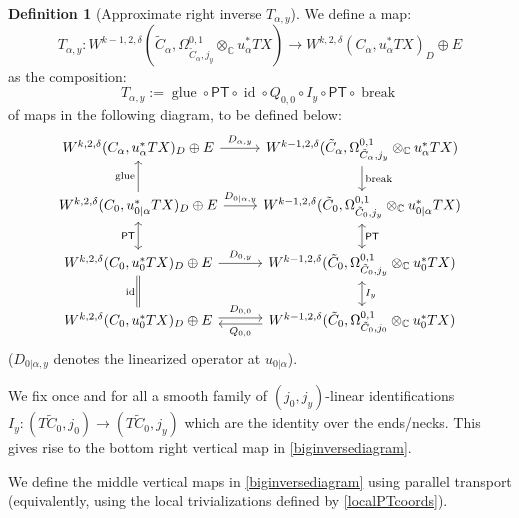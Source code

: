 \documentclass[12pt]{article}
\theoremstyle{definition}
\newtheorem{definition}[theorem]{Definition}
\theoremstyle{remark}
\numberwithin{equation}{subsection}
\newcommand{\CC}{\mathbb C}
\newcommand{\PT}{\mathsf{PT}}
\newcommand{\id}{\operatorname{id}}
\begin{document}
\begin{definition}[Approximate right inverse $T_{\alpha,y}$]
We define a map:
\begin{equation}
T_{\alpha,y}:W^{k-1,2,\delta}(\tilde C_\alpha,\Omega^{0,1}_{\tilde C_\alpha,j_y}\otimes_\CC u_\alpha^\ast TX)\to W^{k,2,\delta}(C_\alpha,u_\alpha^\ast TX)_D\oplus E
\end{equation}
as the composition:
\begin{equation}
T_{\alpha,y}:={\operatorname{glue}}\circ\PT\circ\id\circ Q_{0,0}\circ I_y\circ\PT\circ\operatorname{break}
\end{equation}
of maps in the following diagram, to be defined below:
\begin{equation}\label{biginversediagram}
\begin{tikzcd}
W^{k,2,\delta}(C_\alpha,u_\alpha^\ast TX)_D\oplus E\ar{r}{D_{\alpha,y}}&W^{k-1,2,\delta}(\tilde C_\alpha,\Omega^{0,1}_{\tilde C_\alpha,j_y}\otimes_\CC u_\alpha^\ast TX)\ar{d}{\mathrm{break}}\\
W^{k,2,\delta}(C_0,u_{0|\alpha}^\ast TX)_D\oplus E\ar{u}{\mathrm{glue}}\ar{r}{D_{0|\alpha,y}}&W^{k-1,2,\delta}(\tilde C_0,\Omega^{0,1}_{\tilde C_0,j_y}\otimes_\CC u_{0|\alpha}^\ast TX)\ar[leftrightarrow]{d}{\PT}\\
W^{k,2,\delta}(C_0,u_0^\ast TX)_D\oplus E\ar[leftrightarrow]{u}{\PT}\ar{r}{D_{0,y}}&W^{k-1,2,\delta}(\tilde C_0,\Omega^{0,1}_{\tilde C_0,j_y}\otimes_\CC u_0^\ast TX)\ar[leftrightarrow]{d}{I_y}\\
W^{k,2,\delta}(C_0,u_0^\ast TX)_D\oplus E\ar[equals]{u}{\id}\ar[yshift=0.5ex]{r}{D_{0,0}}&\ar[yshift=-0.5ex]{l}{Q_{0,0}}W^{k-1,2,\delta}(\tilde C_0,\Omega^{0,1}_{\tilde C_0,j_0}\otimes_\CC u_0^\ast TX)
\end{tikzcd}
\end{equation}
($D_{0|\alpha,y}$ denotes the linearized operator at $u_{0|\alpha}$).

We fix once and for all a smooth family of $(j_0,j_y)$-linear identifications $I_y:(T\tilde C_0,j_0)\to(T\tilde C_0,j_y)$ which are the identity over the ends/necks.  This gives rise to the bottom right vertical map in \eqref{biginversediagram}.

We define the middle vertical maps in \eqref{biginversediagram} using parallel transport (equivalently, using the local trivializations defined by \eqref{localPTcoords}).


\end{definition}
\end{document}
